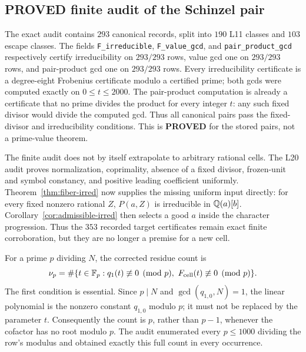 \subsection{PROVED finite audit of the Schinzel pair}

The exact audit contains $293$ canonical records, split into $190$ L11
classes and $103$ escape classes.  The fields
\texttt{F\_irreducible}, \texttt{F\_value\_gcd}, and
\texttt{pair\_product\_gcd} respectively certify irreducibility on
$293/293$ rows, value gcd one on $293/293$ rows, and pair-product gcd one
on $293/293$ rows.  Every irreducibility certificate is a degree-eight
Frobenius certificate modulo a certified prime; both gcds were computed
exactly on $0\leq t\leq 2000$.  The pair-product computation is already a
certificate that no prime divides the product for every integer $t$: any
such fixed divisor would divide the computed gcd.  Thus all canonical
pairs pass the fixed-divisor and irreducibility conditions.  This is
\textbf{PROVED} for the stored pairs, not a prime-value theorem.

The finite audit does not by itself extrapolate to arbitrary rational
cells.  The L20 audit proves normalization, coprimality, absence of a fixed
divisor, frozen-unit and symbol constancy, and positive leading coefficient
uniformly.  Theorem~\ref{thm:fiber-irred} now supplies the missing uniform
input directly: for every fixed nonzero rational $Z$, $P(a,Z)$ is
irreducible in $\mathbb{Q}(a)[b]$.  Corollary~\ref{cor:admissible-irred} then
selects a good $a$ inside the character progression.  Thus the
$353$ recorded target certificates remain exact finite corroboration, but
they are no longer a premise for a new cell.

For a prime $p$ dividing $N$, the corrected residue count is
\[
 \nu_p=\#\{t\in\mathbb{F}_p:q_1(t)\not\equiv0\pmod p,
                  \ F_{\mathrm{cell}}(t)\not\equiv0\pmod p\}.
\]
The first condition is essential.  Since $p\mid N$ and
$\gcd(q_{1,0},N)=1$, the linear polynomial is the nonzero constant
$q_{1,0}$ modulo $p$; it must not be replaced by the parameter $t$.
Consequently the count is $p$, rather than $p-1$, whenever the cofactor has
no root modulo $p$.  The audit enumerated every $p\leq1000$ dividing the
row's modulus and obtained exactly this full count in every occurrence.

